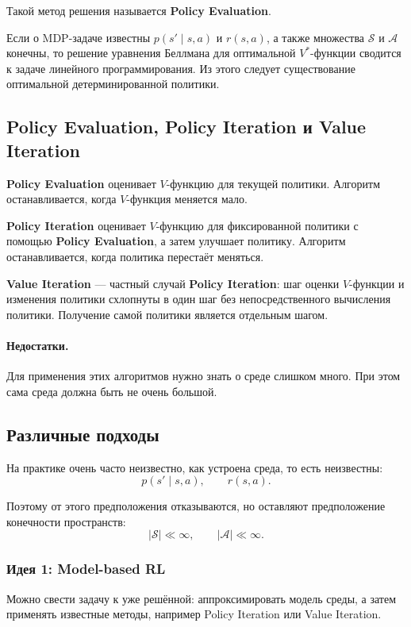 \documentclass[12pt,a4paper]{article}
\begin{document}
Такой метод решения называется \textbf{Policy Evaluation}.

Если о MDP-задаче известны $p(s'\mid s,a)$ и $r(s,a)$, а также множества $\mathcal S$ и $\mathcal A$ конечны, то решение уравнения Беллмана для оптимальной $V^\ast$-функции сводится к задаче линейного программирования. Из этого следует существование оптимальной детерминированной политики.

\subsection{Policy Evaluation, Policy Iteration и Value Iteration}

\textbf{Policy Evaluation} оценивает $V$-функцию для текущей политики. Алгоритм останавливается, когда $V$-функция меняется мало.

\textbf{Policy Iteration} оценивает $V$-функцию для фиксированной политики с помощью \textbf{Policy Evaluation}, а затем улучшает политику. Алгоритм останавливается, когда политика перестаёт меняться.

\textbf{Value Iteration} --- частный случай \textbf{Policy Iteration}: шаг оценки $V$-функции и изменения политики схлопнуты в один шаг без непосредственного вычисления политики. Получение самой политики является отдельным шагом.

\paragraph{Недостатки.}

Для применения этих алгоритмов нужно знать о среде слишком много. При этом сама среда должна быть не очень большой.

\subsection{Различные подходы}

На практике очень часто неизвестно, как устроена среда, то есть неизвестны:
\[
p(s'\mid s,a),
\qquad
r(s,a).
\]

Поэтому от этого предположения отказываются, но оставляют предположение конечности пространств:
\[
|\mathcal S| \ll \infty,
\qquad
|\mathcal A| \ll \infty.
\]

\subsubsection{Идея 1: Model-based RL}

Можно свести задачу к уже решённой: аппроксимировать модель среды, а затем применять известные методы, например Policy Iteration или Value Iteration.
\end{document}
